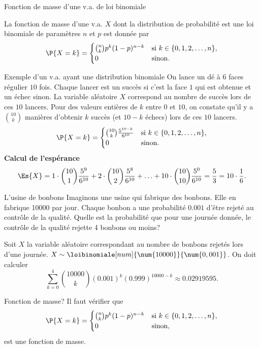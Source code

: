 \documentclass[nuit,charter,pied]{BeamerJS}
\begin{document}
\begin{frame}{Fonction de masse d'une v.a. de loi binomiale}
	\begin{defn}
		La fonction de masse d'une v.a. $X$ dont la distribution de probabilité est une loi binomiale de paramètres $n$ et $p$ est donnée par
		\[
		\P{X=k}=\begin{cases} \binom{n}{k}p^k(1-p)^{n-k} &\text{si}~k\in\{0,1,2,\ldots,n\},\\
			0 & \text{sinon}
			.\end{cases}
		\]
	\end{defn}
\end{frame}
\begin{frame}{Exemple d'un v.a. ayant une distribution binomiale}
	On lance un dé à $6$ faces régulier $10$ fois. Chaque lancer est un succès si c'est la face $1$ qui est obtenue et un échec sinon. La variable aléatoire $X$ correspond au nombre de succès lors de ces $10$ lancers. Pour des valeurs entières de $k$ entre $0$ et $10$, on constate qu'il y a $\binom{10}{k}$ manières d'obtenir $k$ succès (et $10-k$ échecs) lors de ces $10$ lancers.\pause
	\begin{displaymath}
		\P{X=k}=\begin{cases}
			\binom{10}{k}\frac{5^{10-k}}{6^{10}} &\text{si $k\in\{0,1,2,\ldots,n\}$},\\
			0 &\text{sinon}.
		\end{cases}
	\end{displaymath}\pause
	\textbf{Calcul de l'espérance}\\
	\[\Es{X}=1\cdot\binom{10}{1}\frac{5^{9}}{6^{10}}+2\cdot\binom{10}{2}\frac{5^{8}}{6^{10}}+\ldots+10\cdot\binom{10}{10}\frac{5^{0}}{6^{10}}=\frac{5}{3}=10\cdot\frac{1}{6}.\]
\end{frame}
\begin{frame}{L'usine de bonbons}
	Imaginons une usine qui fabrique des bonbons. Elle en fabrique \num{10000} par jour. Chaque bonbon a une probabilité $\num{0,001}$ d'être rejeté au contrôle de la qualité. Quelle est la probabilité que pour une journée donnée, le contrôle de la qualité rejette 4 bonbons ou moins?\pause
	
	Soit $X$ la variable aléatoire correspondant au nombre de bonbons rejetés lors d'une journée. $X\sim\loibinomiale[num]{\num{10000}}{\num{0,001}}$. On doit calculer
	\[\sum_{k=0}^4\binom{\num{10000}}{k}(\num{0,001})^k(\num{0,999})^{\num{10000}-k}\approx \num{0,02919595}.\]
\end{frame}
\begin{frame}[t]{Fonction de masse?}
	Il faut vérifier que 
		\[
	\P{X=k}=\begin{cases} \binom{n}{k}p^k(1-p)^{n-k} &\text{si}~k\in\{0,1,2,\ldots,n\},\\
		0 & \text{sinon}
		,\end{cases}
	\]
	est une fonction de masse.
\end{frame}
\end{document}
